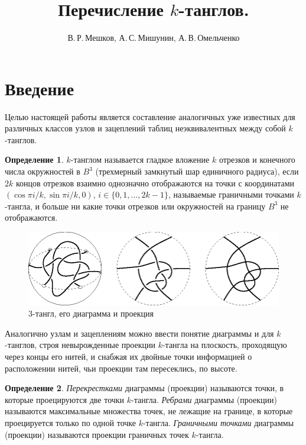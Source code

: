 \documentclass[12pt]{article}
\theoremstyle{plain}
\theoremstyle{definition}
\newtheorem{definition}{Определение}
\begin{document}
	\Russian

	\title{Перечисление $k$-танглов.}
	\author{В.\,Р.\,Мешков, А.\,С.\,Мишунин, А.\,В.\,Омельченко}

	\maketitle
	\tableofcontents

	\newpage
	\section{Введение}

		Целью настоящей работы является составление аналогичных уже известных для различных классов узлов и зацеплений таблиц неэквивалентных
		между собой $k$-танглов.

		\begin{definition}
			\label{definition:tangle}
			$k$-танглом называется гладкое вложение $k$ отрезков и конечного числа окружностей в $B^3$
			(трехмерный замкнутый шар единичного радиуса), если $2k$ концов отрезков взаимно однозначно отображаются
			на точки с координатами $(\cos\pi i/k, \sin\pi i/k, 0)$, $i\in\{0, 1, \dots, 2k{-}1\}$, называемые
			граничными точками $k$-тангла, и больше ни какие точки отрезков или окружностей на границу $B^3$ не отображаются.
		\end{definition}

		\begin{figure}[ht]
			\centering
			\includegraphics{c/tangle-diagram-projection.eps}
			\caption{\footnotesize $3$-тангл, его диаграмма и проекция\label{figure:3-tangle-and-proj}}
		\end{figure}

		Аналогично узлам и зацеплениям можно ввести понятие диаграммы и для $k$-танглов, строя невырожденные проекции $k$-тангла на плоскость,
		проходящую через концы его нитей, и снабжая их двойные точки информацией о расположении нитей, чьи проекции там пересеклись, по высоте.

		\begin{definition}
			\textit{Перекрестками} диаграммы (проекции) называются точки, в которые проецируются две точки $k$-тангла. \textit{Ребрами}
			диаграммы (проекции) называются максимальные множества точек, не лежащие на границе, в которые проецируется
			только по одной точке $k$-тангла. \textit{Граничными точками} диаграммы (проекции) называются проекции граничных точек $k$-тангла.
		\end{definition}
\end{document}
